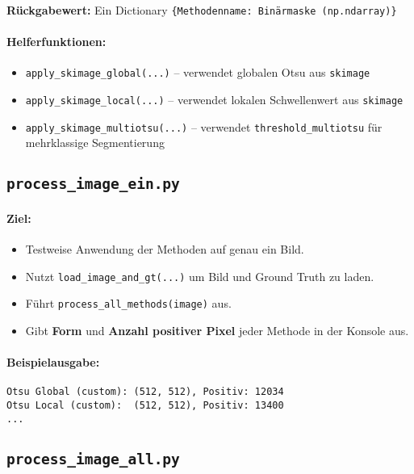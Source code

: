 \documentclass[a4paper,12pt]{article}
\begin{document}
\textbf{Rückgabewert:} Ein Dictionary \texttt{\{Methodenname: Binärmaske (np.ndarray)\}}

\paragraph{Helferfunktionen:}
\begin{itemize}
  \item \texttt{apply\_skimage\_global(...)} – verwendet globalen Otsu aus \texttt{skimage}
  \item \texttt{apply\_skimage\_local(...)} – verwendet lokalen Schwellenwert aus \texttt{skimage}
  \item \texttt{apply\_skimage\_multiotsu(...)} – verwendet \texttt{threshold\_multiotsu} für mehrklassige Segmentierung
\end{itemize}

\subsection*{ \texttt{process\_image\_ein.py}}

\paragraph{Ziel:}
\begin{itemize}
  \item Testweise Anwendung der Methoden auf genau ein Bild.
  \item Nutzt \texttt{load\_image\_and\_gt(...)} um Bild und Ground Truth zu laden.
  \item Führt \texttt{process\_all\_methods(image)} aus.
  \item Gibt \textbf{Form} und \textbf{Anzahl positiver Pixel} jeder Methode in der Konsole aus.
\end{itemize}

\paragraph{Beispielausgabe:}
\begin{verbatim}
Otsu Global (custom): (512, 512), Positiv: 12034
Otsu Local (custom):  (512, 512), Positiv: 13400
...
\end{verbatim}

\subsection*{ \texttt{process\_image\_all.py}}
\end{document}
